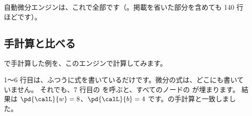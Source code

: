 自動微分エンジンは、これで全部です（。掲載を省いた部分を含めても 140 行ほどです）。

\subsection*{手計算と比べる}

で手計算した例を、このエンジンで計算してみます。


1〜6 行目は、ふつうに式を書いているだけです。微分の式は、どこにも書いていません。
それでも、7 行目の  を呼ぶと、すべてのノードの  が埋まります。
結果は $\pd{\calL}{w}=8$、$\pd{\calL}{b}=4$ です。の手計算と一致しました。

